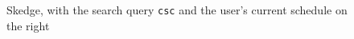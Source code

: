 \begin{figure}[ht]
    \centering
    \caption{Skedge, with the search query {\tt csc} and the user's current schedule on the right}
    \label{fig:sk-index}
\end{figure}